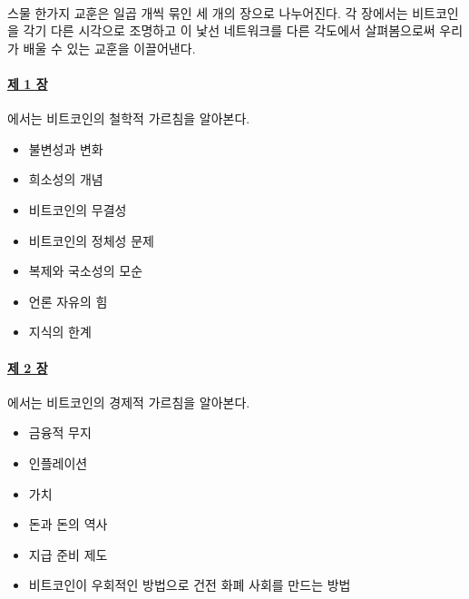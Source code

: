 \paragraph{}
스물 한가지 교훈은 일곱 개씩 묶인 세 개의 장으로 나누어진다. 
각 장에서는 비트코인을 각기 다른 시각으로 조명하고 이 낯선 네트워크를 다른 각도에서 살펴봄으로써 우리가 배울 수 있는 교훈을 이끌어낸다.


\paragraph{\hyperref[ch:philosophy]{제 1 장}}{에서는 비트코인의 철학적 가르침을 알아본다.
	\begin{itemize}
		\item 불변성과 변화
		\item 희소성의 개념
		\item 비트코인의 무결성
		\item 비트코인의 정체성 문제
		\item 복제와 국소성의 모순
		\item 언론 자유의 힘
		\item 지식의 한계
\end{itemize}}


\paragraph{\hyperref[ch:economics]{제 2 장}}{에서는 비트코인의 경제적 가르침을 알아본다.
\begin{itemize}
	\item 금융적 무지
	\item 인플레이션
	\item 가치
	\item 돈과 돈의 역사
	\item 지급 준비 제도
	\item 비트코인이 우회적인 방법으로 건전 화폐 사회를 만드는 방법
	\end{itemize}}
	
